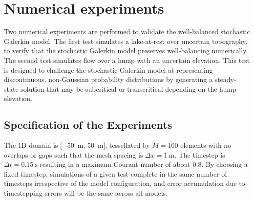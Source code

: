 \section{Numerical experiments}

Two numerical experiments are performed to validate the well-balanced stochastic Galerkin model.
The first test simulates a lake-at-rest over uncertain topography, to verify that the stochastic Galerkin model preserves well-balancing numerically.
The second test simulates flow over a hump with an uncertain elevation.
This test is designed to challenge the stochastic Galerkin model at representing discontinuous, non-Gaussian probability distributions by generating a steady-state solution that may be subcritical or transcritical depending on the hump elevation.

\clearpage
\subsection{Specification of the Experiments}
The 1D domain is [\SI{-50}{\meter}, \SI{50}{\meter}], tessellated by $M = 100$ elements with no overlaps or gaps such that the mesh spacing is $\Delta x = \SI{1}{\meter}$.
The timestep is $\Delta t = \SI{0.15}{\second}$ resulting in a maximum Courant number of about $0.8$.
By choosing a fixed timestep, simulations of a given test complete in the same number of timesteps irrespective of the model configuration, and error accumulation due to timestepping errors will be the same across all models.

